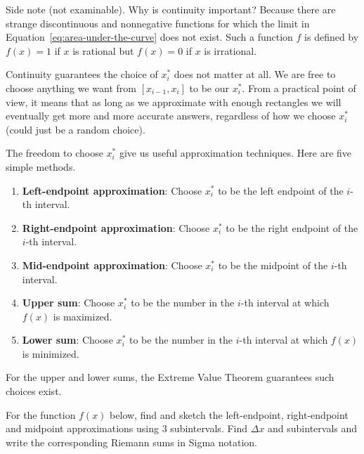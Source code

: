 \documentclass[../main.tex]{subfiles}
\begin{document}
Side note (not examinable). Why is continuity important? Because there are strange discontinuous and nonnegative functions for which the limit in Equation~\eqref{eq:area-under-the-curve} does not exist.  Such a function \(f\) is defined by \(f(x) = 1\) if \(x\) is rational but \(f(x) = 0\) if \(x\) is irrational. 

\clearpage
Continuity guarantees the choice of \(x_{i}^{*}\) does not matter at all. We are free to choose anything we want from \([x_{i-1}, x_{i}]\) to be our \(x_{i}^{*}\). From a practical point of view, it means that as long as we approximate with enough rectangles we will eventually get more and more accurate answers, regardless of how we choose \(x_{i}^{*}\) (could just be a random choice).

The freedom to choose \(x_{i}^{*}\) give us useful approximation techniques. Here are five simple methods.
\begin{enumerate}
  \item \textbf{Left-endpoint approximation}: Choose \(x_{i}^{*}\) to be the left endpoint of the \(i\)-th interval.
  \item \textbf{Right-endpoint approximation}: Choose \(x_{i}^{*}\) to be the right endpoint of the \(i\)-th interval.
  \item \textbf{Mid-endpoint approximation}: Choose \(x_{i}^{*}\) to be the midpoint of the \(i\)-th interval.
  \item \textbf{Upper sum}: Choose \(x_{i}^{*}\) to be the number in the \(i\)-th interval at which \(f(x)\) is maximized.
  \item \textbf{Lower sum}: Choose \(x_{i}^{*}\) to be the number in the \(i\)-th interval at which \(f(x)\) is minimized.
\end{enumerate}
For the upper and lower sums, the Extreme Value Theorem guarantees such choices exist.

\begin{example}
  For the function \(f(x)\) below, find and sketch the left-endpoint, right-endpoint and midpoint approximations using \(3\) subintervals. Find \(\Delta x\) and subintervals and write the corresponding Riemann sums in Sigma notation.

  \hfill{}
  
  \hfill{}
  
  \hfill{}
  
  \hfill{}

\end{example}
\clearpage
\end{document}
